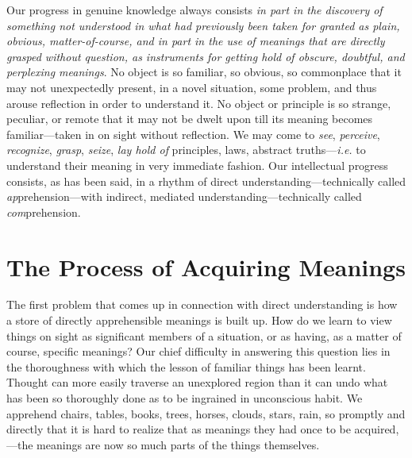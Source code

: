 \documentclass[letterpaper]{book}
\begin{document}

Our progress in genuine knowledge always consists \emph{in part in the
discovery of something not understood in what had previously been taken
for granted as plain, obvious, matter-of-course, and in part in the use
of meanings that are directly grasped without question, as instruments
for getting hold of obscure, doubtful, and perplexing meanings}. No
object is so familiar, so obvious, so commonplace that it may not
unexpectedly present, in a novel situation, some problem, and thus
arouse reflection in order to understand it. No object or principle is
so strange, peculiar, or remote that it may not be dwelt upon till its
meaning becomes familiar---taken in on sight without reflection. We may
come to \emph{see}, \emph{perceive}, \emph{recognize}, \emph{grasp},
\emph{seize}, \emph{lay hold of} principles, laws, abstract
truths---\emph{i.e.} to understand their meaning in very immediate
fashion. Our intellectual progress consists, as has been said, in a
rhythm of direct understanding---technically called
\emph{ap}prehension---with indirect, mediated
understanding---technically called \emph{com}prehension.

\section{The Process of Acquiring Meanings}


The first problem that comes up in connection with direct understanding
is how a store of directly
apprehensible
meanings is built up. How do we learn to view things on sight as
significant members of a situation, or as having, as a matter of course,
specific meanings? Our chief difficulty in answering this question lies
in the thoroughness with which the lesson of familiar things has been
learnt. Thought can more easily traverse an unexplored region than it
can undo what has been so thoroughly done as to be ingrained in
unconscious habit. We apprehend chairs, tables, books, trees, horses,
clouds, stars, rain, so promptly and directly that it is hard to realize
that as meanings they had once to be acquired,---the meanings are now so
much parts of the things themselves.

\end{document}
